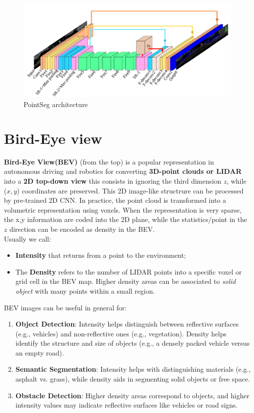 \begin{figure}
    \centering
    \includegraphics[scale=0.5]{img/PointSeg.png}
    \caption{PointSeg architecture}
\end{figure}

\section{Bird-Eye view}
\textbf{Bird-Eye View(BEV)} (from the top) is a popular representation in autonomous driving and robotics for converting \textbf{3D-point clouds or LIDAR} into a \textbf{2D top-down view} this consists in ignoring the third dimension $z$, while ($x,y$) coordinates are preserved. This 2D image-like structrure can be processed by pre-trained 2D CNN. In practice, the point cloud is transformed into a volumetric representation using voxels. When the representation is very sparse, the x,y information are coded into the 2D plane, while the statistics/point in the $z$ direction can be encoded as density in the BEV.\\
Usually we call: 
\begin{itemize}
    \item \textbf{Intensity} that returns from a point to the environment; 
    \item The \textbf{Density} refers to the number of LIDAR points into a specific voxel or grid cell in the BEV map. Higher density areas can be associated to \textit{solid object} with many points within a small region.
\end{itemize}

BEV images can be useful in general for:
\begin{enumerate}
    \itemsep-0.3em
    \item \textbf{Object Detection}:
    Intensity helps distinguish between reflective surfaces (e.g., vehicles) and non-reflective ones (e.g., vegetation).
    Density helps identify the structure and size of objects (e.g., a densely packed vehicle versus an empty road).
    \item \textbf{Semantic Segmentation}:
    Intensity helps with distinguishing materials (e.g., asphalt vs. grass), while density aids in segmenting solid objects or free space.
    \item \textbf{Obstacle Detection}:
Higher density areas correspond to objects, and higher intensity values may indicate reflective surfaces like vehicles or road signs.
\end{enumerate}

